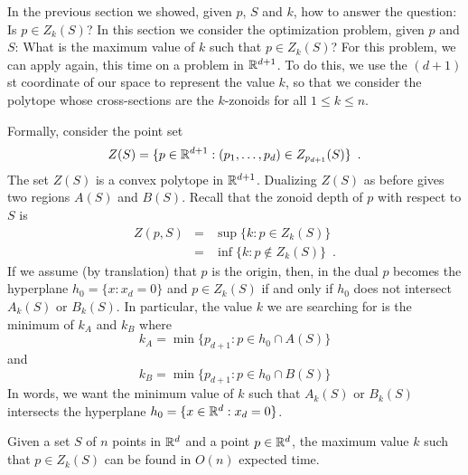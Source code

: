 \documentclass[lotsofwhite]{patmorin}
\begin{document}
In the previous section we showed, given $p$, $S$ and $k$, how to
answer the question:  Is $p\in Z_k(S)$?  In this section we consider
the optimization problem, given $p$ and $S$: What is the maximum value
of $k$ such that $p\in Z_k(S)$?  For this problem, we can apply
 again, this time on a problem in $\mathbb{R}^{d+1}$.  To do
this, we use the $(d+1)$st coordinate of our space to represent the
value $k$, so that we consider the polytope whose cross-sections are
the $k$-zonoids for all $1\le k\le n$.

Formally,
consider the point set
\[
    Z(S)=\{p\in\mathbb{R}^{d+1} : (p_1,\ldots,p_d)\in Z_{p_{d+1}}(S)  \} \enspace .
\]
The set $Z(S)$ is a convex polytope in $\mathbb{R}^{d+1}$.
Dualizing $Z(S)$ as before gives two regions
$A(S)$ and $B(S)$.
Recall that
the zonoid depth  of $p$ with respect to $S$ is
\begin{eqnarray*}
   Z(p,S) & = & \sup\{k:p\in Z_k(S)\} \\
          & = & \inf\{k:p\notin Z_k(S) \} \enspace .
\end{eqnarray*}
If we assume (by translation) that $p$ is the origin, then,
in the dual $p$ becomes the hyperplane $h_0=\{x:x_d=0\}$ and $p\in
Z_k(S)$ if and only if $h_0$ does not intersect $A_k(S)$ or $B_k(S)$.
In particular, the value $k$ we are searching for is the minimum of
$k_A$ and $k_B$ where
\[
   k_A = \min\{p_{d+1}: p\in h_0\cap A(S)\}
\]
and
\[
   k_B = \min\{p_{d+1}: p\in h_0\cap B(S)\}
\]
In words, we want the minimum value of $k$ such that $A_k(S)$ or
$B_k(S)$ intersects the hyperplane $h_0=\{x\in\mathbb{R}^d: x_d=0\}$.

\begin{thm}
Given a set $S$ of $n$ points in $\mathbb{R}^d$ and a point $p\in\mathbb{R}^d$, the
maximum value $k$ such that $p\in Z_k(S)$ can be found in $O(n)$
expected time.
\end{thm}
\end{document}
